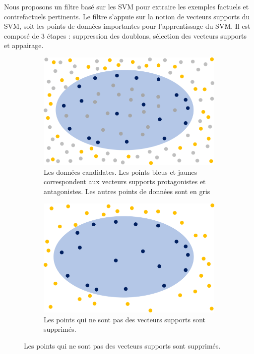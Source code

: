 Nous proposons un filtre basé sur les SVM pour extraire les exemples factuels et contrefactuels pertinents. Le filtre s'appuie sur la notion de vecteurs supports du SVM, soit les points de données importantes pour l'apprentissage du SVM. Il est composé de 3 étapes : suppression des doublons, sélection des vecteurs supports et appairage.
\begin{figure}[h!tpb]
    \begin{subfigure}[t]{0.45\textwidth}
      \centering\includegraphics[width=\textwidth]{S4-Explicabilite_globale/figures/filtre1.png}
      \caption{Les données candidates. Les points bleus et jaunes correspondent aux vecteurs supports protagonistes et antagonistes. Les autres points de données sont en gris}  \label{fig:filtre1}
    \end{subfigure} \qquad
    \begin{subfigure}[t]{0.45\textwidth}
      \centering\includegraphics[width=\textwidth]{S4-Explicabilite_globale/figures/filtre2.png}
      \caption{ Les points qui ne sont pas des vecteurs supports sont supprimés.} \label{fig:filtre2}
  \end{subfigure}


\end{figure}
